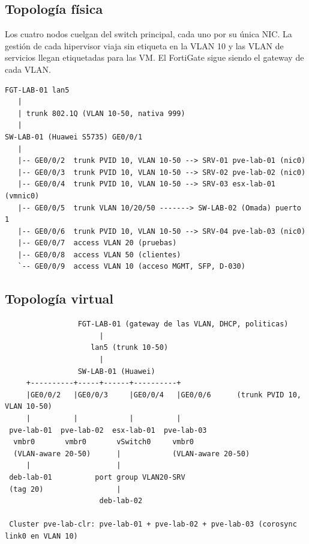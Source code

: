 \documentclass[11pt,a4paper]{article}
\begin{document}
\subsection{Topología física}
Los cuatro nodos cuelgan del switch principal, cada uno por su única NIC. La gestión de cada hipervisor viaja sin etiqueta en la VLAN 10 y las VLAN de servicios llegan etiquetadas para las VM. El FortiGate sigue siendo el gateway de cada VLAN.

\begin{lstlisting}
FGT-LAB-01 lan5
   |
   | trunk 802.1Q (VLAN 10-50, nativa 999)
   |
SW-LAB-01 (Huawei S5735) GE0/0/1
   |
   |-- GE0/0/2  trunk PVID 10, VLAN 10-50 --> SRV-01 pve-lab-01 (nic0)
   |-- GE0/0/3  trunk PVID 10, VLAN 10-50 --> SRV-02 pve-lab-02 (nic0)
   |-- GE0/0/4  trunk PVID 10, VLAN 10-50 --> SRV-03 esx-lab-01 (vmnic0)
   |-- GE0/0/5  trunk VLAN 10/20/50 -------> SW-LAB-02 (Omada) puerto 1
   |-- GE0/0/6  trunk PVID 10, VLAN 10-50 --> SRV-04 pve-lab-03 (nic0)
   |-- GE0/0/7  access VLAN 20 (pruebas)
   |-- GE0/0/8  access VLAN 50 (clientes)
   `-- GE0/0/9  access VLAN 10 (acceso MGMT, SFP, D-030)
\end{lstlisting}

\subsection{Topología virtual}
\begin{lstlisting}
                 FGT-LAB-01 (gateway de las VLAN, DHCP, politicas)
                      |
                    lan5 (trunk 10-50)
                      |
                 SW-LAB-01 (Huawei)
     +----------+-----+------+----------+
     |GE0/0/2   |GE0/0/3     |GE0/0/4   |GE0/0/6      (trunk PVID 10, VLAN 10-50)
     |          |            |          |
 pve-lab-01  pve-lab-02  esx-lab-01  pve-lab-03
  vmbr0       vmbr0       vSwitch0     vmbr0
  (VLAN-aware 20-50)      |            (VLAN-aware 20-50)
     |                    |
 deb-lab-01          port group VLAN20-SRV
 (tag 20)                 |
                      deb-lab-02

 Cluster pve-lab-clr: pve-lab-01 + pve-lab-02 + pve-lab-03 (corosync link0 en VLAN 10)
\end{lstlisting}
\end{document}
